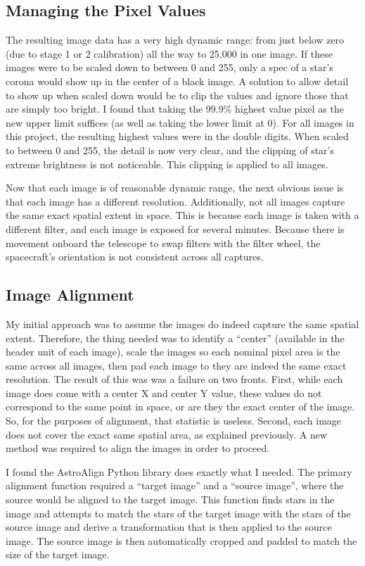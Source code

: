 \documentclass[10pt,twocolumn,letterpaper]{article}
\begin{document}
\subsection{Managing the Pixel Values}
The resulting image data has a very high dynamic range: from just below zero (due to stage 1 or 2 calibration) all the way to 25,000 in one image. If these images were to be scaled down to between 0 and 255, only a spec of a star's corona would show up in the center of a black image. A solution to allow detail to show up when scaled down would be to clip the values and ignore those that are simply too bright. I found that taking the 99.9\% highest value pixel as the new upper limit suffices (as well as taking the lower limit at 0). For all images in this project, the resulting highest values were in the double digits. When scaled to between 0 and 255, the detail is now very clear, and the clipping of star's extreme brightness is not noticeable. This clipping is applied to all images.

Now that each image is of reasonable dynamic range, the next obvious issue is that each image has a different resolution. Additionally, not all images capture the same exact spatial extent in space. This is because each image is taken with a different filter, and each image is exposed for several minutes. Because there is movement onboard the telescope to swap filters with the filter wheel, the spacecraft's orientation is not consistent across all captures.

\subsection{Image Alignment}
My initial approach was to assume the images do indeed capture the same spatial extent. Therefore, the thing needed was to identify a ``center'' (available in the header unit of each image), scale the images so each nominal pixel area is the same across all images, then pad each image to they are indeed the same exact resolution. The result of this was was a failure on two fronts. First, while each image does come with a center X and center Y value, these values do not correspond to the same point in space, or are they the exact center of the image. So, for the purposes of alignment, that statistic is useless. Second, each image does not cover the exact same spatial area, as explained previously. A new method was required to align the images in order to proceed.

I found the AstroAlign Python library does exactly what I needed. The primary alignment function required a ``target image'' and a ``source image'', where the source would be aligned to the target image. This function finds stars in the image and attempts to match the stars of the target image with the stars of the source image and derive a transformation that is then applied to the source image. The source image is then automatically cropped and padded to match the size of the target image.
\end{document}

